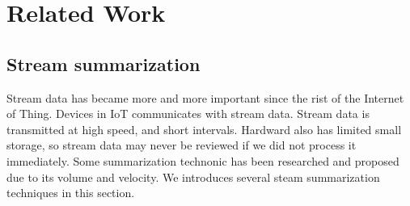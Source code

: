 \chapter{Related Work}
\section{Stream summarization}

Stream data has became more and more important since the rist of the Internet of
Thing. Devices in IoT communicates with stream data. Stream data is transmitted
at high speed, and short intervals. Hardward also has limited small storage, so
stream data may never be reviewed if we did not process it immediately. Some
summarization technonic has been researched and proposed due to its volume and
velocity. We introduces several steam summarization techniques in this section.


